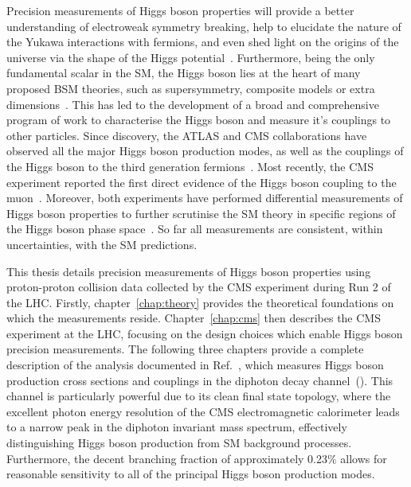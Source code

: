 Precision measurements of Higgs boson properties will provide a better understanding of electroweak symmetry breaking, help to elucidate the nature of the Yukawa interactions with fermions, and even shed light on the origins of the universe via the shape of the Higgs potential~\cite{Kajantie:1995kf,Csikor:1998eu}. Furthermore, being the only fundamental scalar in the SM, the Higgs boson lies at the heart of many proposed BSM theories, such as supersymmetry, composite models or extra dimensions~\cite{Martin:1997ns,Witzel:2019jbe,Quiros:2013yaa}. This has led to the development of a broad and comprehensive program of work to characterise the Higgs boson and measure it's couplings to other particles. Since discovery, the ATLAS and CMS collaborations have observed all the major Higgs boson production modes, as well as the couplings of the Higgs boson to the third generation fermions~\cite{Aaboud:2018urx,Aaboud:2018zhk,Aaboud:2018pen,Sirunyan:2018hoz,Sirunyan:2018kst,Sirunyan:2017khh}. Most recently, the CMS experiment reported the first direct evidence of the Higgs boson coupling to the muon~\cite{Sirunyan:2020two}. Moreover, both experiments have performed differential measurements of Higgs boson properties to further scrutinise the SM theory in specific regions of the Higgs boson phase space~\cite{ATLAS:2020wny,ATLAS-CONF-2019-029,Aad:2020jym,Sirunyan:2020hwz,Sirunyan:2020tzo}. So far all measurements are consistent, within uncertainties, with the SM predictions.

This thesis details precision measurements of Higgs boson properties using proton-proton collision data collected by the CMS experiment during Run 2 of the LHC. Firstly, chapter~\ref{chap:theory} provides the theoretical foundations on which the measurements reside. Chapter~\ref{chap:cms} then describes the CMS experiment at the LHC, focusing on the design choices which enable Higgs boson precision measurements. The following three chapters provide a complete description of the analysis documented in Ref.~\cite{Sirunyan:2021ybb}, which measures Higgs boson production cross sections and couplings in the diphoton decay channel~(\Hgg). This channel is particularly powerful due to its clean final state topology, where the excellent photon energy resolution of the CMS electromagnetic calorimeter leads to a narrow peak in the diphoton invariant mass spectrum, effectively distinguishing Higgs boson production from SM background processes. Furthermore, the decent branching fraction of approximately 0.23\% allows for reasonable sensitivity to all of the principal Higgs boson production modes. 

